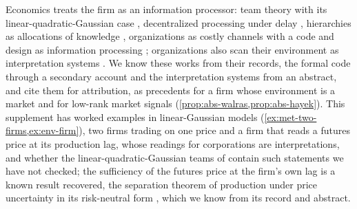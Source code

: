 Economics treats the firm as an information processor: team theory with its linear-quadratic-Gaussian case \citep{radner1962team,marschak1972economic}, decentralized processing under delay \citep{radner1993organization}, hierarchies as allocations of knowledge \citep{garicano2000hierarchies}, organizations as costly channels with a code \citep{arrow1974limits,cremer2007language} and design as information processing \citep{galbraith1974organization}; organizations also scan their environment as interpretation systems \citep{daft1984toward}. We know these works from their records, the formal code through a secondary account and the interpretation systems from an abstract, and cite them for attribution, as precedents for a firm whose environment is a market and for low-rank market signals (\cref{prop:abs-walras,prop:abs-hayek}). This supplement has worked examples in linear-Gaussian models (\cref{ex:met-two-firms,ex:env-firm}), two firms trading on one price and a firm that reads a futures price at its production lag, whose readings for corporations are interpretations, and whether the linear-quadratic-Gaussian teams of \citet{radner1962team} contain such statements we have not checked; the sufficiency of the futures price at the firm's own lag is a known result recovered, the separation theorem of production under price uncertainty in its risk-neutral form \citep{feder1980futures}, which we know from its record and abstract.
